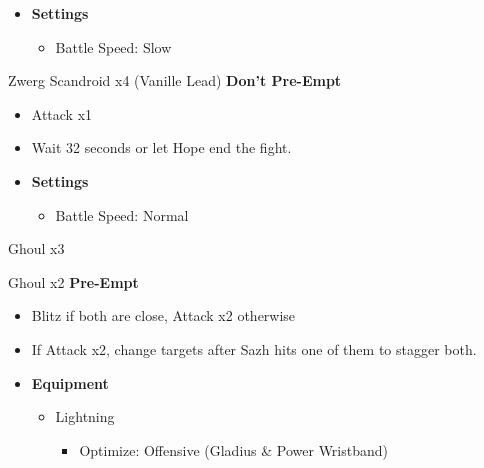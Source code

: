 \begin{multicols}{2}
\begin{menu}
\begin{itemize}
    \item \textbf{Settings}
    \begin{itemize}
        \item Battle Speed: Slow
    \end{itemize}
\end{itemize}
\end{menu}

\begin{battle}{Zwerg Scandroid x4 (Vanille Lead) \textbf{Don't Pre-Empt}}
\begin{itemize}
    \item Attack x1
    \item Wait 32 seconds or let Hope end the fight.
\end{itemize}
\end{battle}

\begin{menu}
\begin{itemize}
    \item \textbf{Settings}
    \begin{itemize}
        \item Battle Speed: Normal
    \end{itemize}
\end{itemize}
\end{menu}

\begin{battle}{Ghoul x3}
\end{battle}

\begin{battle}{Ghoul x2 \textbf{Pre-Empt}}
\begin{itemize}
    \item Blitz if both are close, Attack x2 otherwise
    \item If Attack x2, change targets after Sazh hits one of them to stagger both.
\end{itemize}
\end{battle}


\begin{menu}
\begin{itemize}
    \item \textbf{Equipment}
    \begin{itemize}
        \item Lightning
        \begin{itemize}
            \item Optimize: Offensive (Gladius \& Power Wristband)
        \end{itemize}
    \end{itemize}
\end{itemize}
\end{menu}


\end{multicols}
